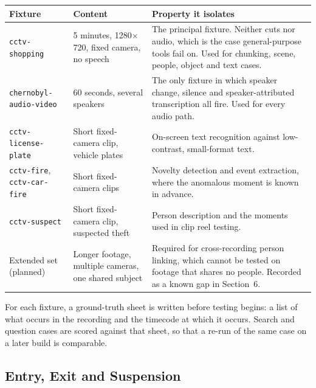\begin{table}[htbp]
\centering
\small
\begin{tabularx}{\textwidth}{@{}L{3.0cm}L{3.4cm}X@{}}
\toprule
\textbf{Fixture} & \textbf{Content} & \textbf{Property it isolates} \\
\midrule
\texttt{cctv-shopping} & 5 minutes, 1280$\times$720, fixed camera, no speech &
The principal fixture. Neither cuts nor audio, which is the case general-purpose tools
fail on. Used for chunking, scene, people, object and text cases. \\
\texttt{chernobyl-\allowbreak audio-video} & 60 seconds, several speakers &
The only fixture in which speaker change, silence and speaker-attributed transcription
all fire. Used for every audio path. \\
\texttt{cctv-license-plate} & Short fixed-camera clip, vehicle plates &
On-screen text recognition against low-contrast, small-format text. \\
\texttt{cctv-fire}, \texttt{cctv-car-fire} & Short fixed-camera clips &
Novelty detection and event extraction, where the anomalous moment is known in advance. \\
\texttt{cctv-suspect} & Short fixed-camera clip, suspected theft &
Person description and the moments used in clip reel testing. \\
Extended set (planned) & Longer footage, multiple cameras, one shared subject &
Required for cross-recording person linking, which cannot be tested on footage that
shares no people. Recorded as a known gap in Section~6. \\
\bottomrule
\end{tabularx}
\end{table}

For each fixture, a ground-truth sheet is written before testing begins: a list of what
occurs in the recording and the timecode at which it occurs. Search and question cases
are scored against that sheet, so that a re-run of the same case on a later build is
comparable.

\subsection{Entry, Exit and Suspension}

